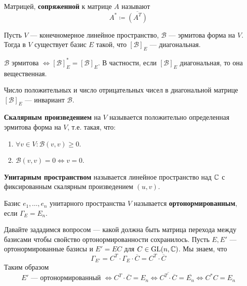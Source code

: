 \documentclass[../main.tex]{subfiles}
\begin{document}
\begin{definition}
  Матрицей, \textbf{сопряженной} к матрице $A$ называют
  \begin{equation*}
    A^{*} \coloneqq \overline{(A^T)}
  \end{equation*}
\end{definition}

\begin{theorem}[Лагранжа]
  Пусть $V$ --- конечномерное линейное пространство, $\mathcal{B}$ --- эрмитова форма на $V$. Тогда в $V$ существует базис $E$ такой, что $[\mathcal{B}]_E$ --- диагональная.
\end{theorem}

\begin{remark}
  $\mathcal{B}$ эрмитова $\iff [\mathcal{B}]_E^{*} = [\mathcal{B}]_E$. В частности, если $[\mathcal{B}]_E$ диагональная, то она вещественная.
\end{remark}

\begin{theorem}
  Число положительных и число отрицательных чисел в диагональной матрице $[\mathcal{B}]_E$ --- инвариант $\mathcal{B}$.
\end{theorem}

\begin{definition}
  \textbf{Скалярным произведением} на $V$ называется положительно определенная эрмитова форма на $V$, т.е. такая, что:
  \begin{enumerate}
    \item $\forall v \in V\colon \mathcal{B}(v, v) \geq 0$.
    \item $\mathcal{B}(v, v) = 0 \iff v = 0$.
  \end{enumerate}
\end{definition}

\begin{definition}
  \textbf{Унитарным пространством} называется линейное пространство над $\mathbb{C}$ с фиксированным скалярным произведением $(u, v)$.
\end{definition}

\begin{definition}
  Базис $e_1, \dotsc, e_n$ унитарного пространства $V$ называется \textbf{ортонормированным}, если $\Gamma_E = E_n$.
\end{definition}

Давайте зададимся вопросом --- какой должна быть матрица перехода между базисами чтобы свойство ортонормированности сохранилось. Пусть $E, E'$ --- ортонормированные базисы и $E' = EC$ для $C \in \operatorname{GL}(n, \mathbb{C})$. Мы знаем, что
\begin{equation*}
  \Gamma_{E'} = C^T \cdot \Gamma_E \cdot \overline{C} = C^T \cdot \overline{C}
\end{equation*}
Таким образом
\begin{equation*}
  E' \text{ --- ортонормированный } \iff C^T \cdot \overline{C} = E_n \iff \overline{C^T \cdot \overline{C}} = \overline{E_n} \iff C^{*} C = E_n
\end{equation*}
\end{document}
